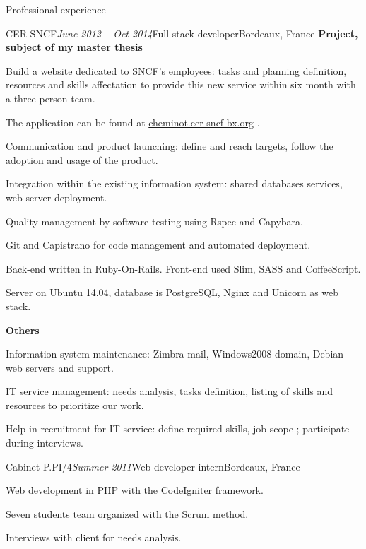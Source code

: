 \begin{rSection}{Professional experience}
\begin{rSubsection}{CER SNCF}{\em June 2012 -- Oct 2014}{Full-stack developer}{Bordeaux, France}
    \textbf{Project, subject of my master thesis}
      \item Build a website dedicated to SNCF's employees: tasks and planning definition, resources and skills affectation to provide this new service within six month with a three person team.
      \item The application can be found at \href{http://cheminot.cer-sncf-bx.org}{cheminot.cer-sncf-bx.org} .
      \item Communication and product launching: define and reach targets, follow the adoption and usage of the product.
      \item Integration within the existing information system: shared databases services, web server deployment.
      \item Quality management by software testing using Rspec and Capybara.
      \item Git and Capistrano for code management and automated deployment.
      \item Back-end written in Ruby-On-Rails. Front-end used Slim, SASS and CoffeeScript.
      \item Server on Ubuntu 14.04, database is PostgreSQL, Nginx and Unicorn as web stack.

    \textbf{Others}
      \item Information system maintenance: Zimbra mail, Windows2008 domain, Debian web servers and support.
      \item IT service management: needs analysis, tasks definition, listing of skills and resources to prioritize our work.
      \item Help in recruitment for IT service: define required skills, job scope ; participate during interviews.

  \end{rSubsection}


  \begin{rSubsection}{Cabinet P.PI/4}{\em Summer 2011}{Web developer intern}{Bordeaux, France}
    \item Web development in PHP with the CodeIgniter framework.
    \item Seven students team organized with the Scrum method.
    \item Interviews with client for needs analysis.
  \end{rSubsection}

\end{rSection}
